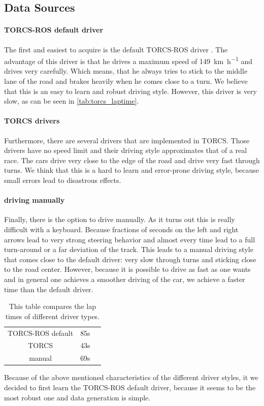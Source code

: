 \documentclass[10pt,a4paper,twoside,journal]{IEEEtran}
\begin{document}
\subsection{Data Sources}
\paragraph{TORCS-ROS default driver}
The first and easiest to acquire is the default TORCS-ROS driver \cite{mirus_torcs-ros_2017}. The advantage of this driver is that he drives a maximum speed of \SI{149}{\km\per\hour} and drives very carefully. Which means, that he always tries to stick to the middle lane of the road and brakes heavily when he comes close to a turn. We believe that this is an easy to learn and robust driving style. However, this driver is very slow, as can be seen in \autoref{tab:torcs_laptime}.
\paragraph{TORCS drivers}
Furthermore, there are several drivers that are implemented in TORCS. Those drivers have no speed limit and their driving style approximates that of a real race. The cars drive very close to the edge of the road and drive very fast through turns. We think that this is a hard to learn and error-prone driving style, because small errors lead to disastrous effects.
\paragraph{driving manually}
Finally, there is the option to drive manually. As it turns out this is really difficult with a keyboard. Because fractions of seconds on the left and right arrows lead to very strong steering behavior and almost every time lead to a full turn-around or a far deviation of the track. This leads to a manual driving style that comes close to the default driver: very slow through turns and sticking close to the road center. However, because it is possible to drive as fast as one wants and in general one achieves a smoother driving of the car, we achieve a faster time than the default driver. \\

\begin{table}[ht]
	\centering
		\begin{tabular}{ |c|c|c| } 
			\hline
			TORCS-ROS default & 85s \\
			TORCS  & 43s  \\
			manual & 69s \\
			\hline
		\end{tabular}
		\caption{\label{tab:torcs_laptime}This table compares the lap times of different driver types.}
\end{table}
Because of the above mentioned characteristics of the different driver styles, it we decided to first learn the TORCS-ROS default driver, because it seems to be the most robust one and data generation is simple.
\end{document}
